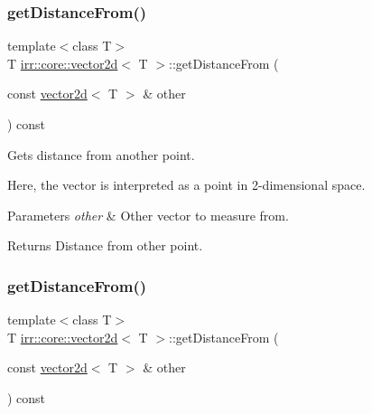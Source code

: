 \subsubsection{\texorpdfstring{get\+Distance\+From()}{getDistanceFrom()}\hspace{0.1cm}{\footnotesize\ttfamily [1/2]}}
{\footnotesize\ttfamily template$<$class T$>$ \\
T \hyperlink{classirr_1_1core_1_1vector2d}{irr\+::core\+::vector2d}$<$ T $>$\+::get\+Distance\+From (\begin{DoxyParamCaption}\item[{const \hyperlink{classirr_1_1core_1_1vector2d}{vector2d}$<$ T $>$ \&}]{other }\end{DoxyParamCaption}) const\hspace{0.3cm}{\ttfamily [inline]}}



Gets distance from another point. 

Here, the vector is interpreted as a point in 2-\/dimensional space. 
\begin{DoxyParams}{Parameters}
{\em other} & Other vector to measure from. \\
\hline
\end{DoxyParams}
\begin{DoxyReturn}{Returns}
Distance from other point. 
\end{DoxyReturn}
\mbox{\label{classirr_1_1core_1_1vector2d_a351a36a3c2fff525fc17ec15c5d0207f}} 
\subsubsection{\texorpdfstring{get\+Distance\+From()}{getDistanceFrom()}\hspace{0.1cm}{\footnotesize\ttfamily [2/2]}}
{\footnotesize\ttfamily template$<$class T$>$ \\
T \hyperlink{classirr_1_1core_1_1vector2d}{irr\+::core\+::vector2d}$<$ T $>$\+::get\+Distance\+From (\begin{DoxyParamCaption}\item[{const \hyperlink{classirr_1_1core_1_1vector2d}{vector2d}$<$ T $>$ \&}]{other }\end{DoxyParamCaption}) const\hspace{0.3cm}{\ttfamily [inline]}}



